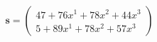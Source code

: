 \documentclass[preview]{standalone}
\begin{document}
\begin{align*}
\mathbf{s} = \begin{pmatrix}47 + 76x^{1} + 78x^{2} + 44x^{3} \\ 5 + 89x^{1} + 78x^{2} + 57x^{3}\end{pmatrix}
\end{align*}
\end{document}

